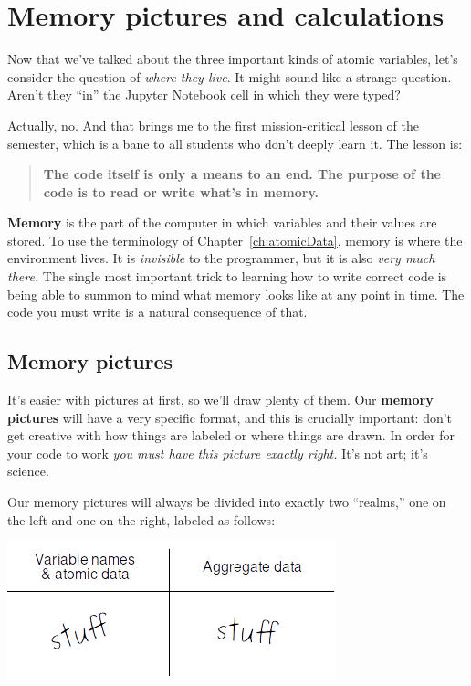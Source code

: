 

\chapter{Memory pictures and calculations}

Now that we've talked about the three important kinds of atomic variables,
let's consider the question of \textit{where they live}. It might sound like a
strange question. Aren't they ``in'' the Jupyter Notebook cell in which they
were typed?

Actually, no. And that brings me to the first mission-critical lesson of the
semester, which is a bane to all students who don't deeply learn it. The lesson
is:

\begin{quote}
\textbf{The code itself is only a means to an end. The purpose of the code is
to read or write what's in memory.}
\end{quote}

\textbf{Memory} is the part of the computer in which variables and their values
are stored. To use the terminology of Chapter~\ref{ch:atomicData}, memory is
where the environment lives. It is \textit{invisible} to the programmer, but it
is also \textit{very much there.} The single most important trick to learning
how to write correct code is being able to summon to mind what memory looks
like at any point in time. The code you must write is a natural consequence of
that.

\section{Memory pictures}

It's easier with pictures at first, so we'll draw plenty of them. Our
\textbf{memory pictures} will have a very specific format, and this is
crucially important: don't get creative with how things are labeled or where
things are drawn. In order for your code to work \textit{you must have this
picture exactly right.} It's not art; it's science.

Our memory pictures will always be divided into exactly two ``realms,'' one on
the left and one on the right, labeled as follows:

\begin{center}
\includegraphics[width=.7\textwidth]{memoryPicture.png}
\end{center}

